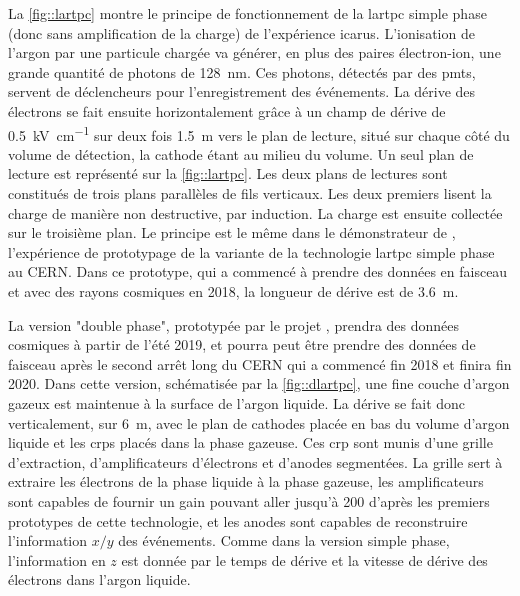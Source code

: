     La \autoref{fig::lartpc} montre le principe de fonctionnement de la \gls{lartpc} simple phase (donc sans amplification de la charge) de l'expérience \gls{icarus}. L'ionisation de l'argon par une particule chargée va générer, en plus des paires électron-ion, une grande quantité de photons de \SI{128}{\nano\meter}. Ces photons, détectés par des \glspl{pmt}, servent de déclencheurs pour l'enregistrement des événements. La dérive des électrons se fait ensuite horizontalement grâce à un champ de dérive de \SI{0.5}{\kilo\volt\per\centi\meter} sur deux fois \SI{1.5}{\meter} vers le plan de lecture, situé sur chaque côté du volume de détection, la cathode étant au milieu du volume. Un seul plan de lecture est représenté sur la \autoref{fig::lartpc}. Les deux plans de lectures sont constitués de trois plans parallèles de fils verticaux. Les deux premiers lisent la charge de manière non destructive, par induction. La charge est ensuite collectée sur le troisième plan. Le principe est le même dans le démonstrateur de \protosp{}, l'expérience de prototypage de la variante de la technologie \gls{lartpc} simple phase au CERN. Dans ce prototype, qui a commencé à prendre des données en faisceau et avec des rayons cosmiques en 2018, la longueur de dérive est de \SI{3.6}{\meter}.

    La version "double phase", prototypée par le projet \protodp{}, prendra des données cosmiques à partir de l'été 2019, et pourra peut être prendre des données de faisceau après le second arrêt long du CERN qui a commencé fin 2018 et finira fin 2020. Dans cette version, schématisée par la \autoref{fig::dlartpc}, une fine couche d'argon gazeux est maintenue à la surface de l'argon liquide. La dérive se fait donc verticalement, sur \SI{6}{\meter}, avec le plan de cathodes placée en bas du volume d'argon liquide et les \glspl{crp} placés dans la phase gazeuse. Ces \gls{crp} sont munis d'une grille d'extraction, d'amplificateurs d'électrons et d'anodes segmentées. La grille sert à extraire les électrons de la phase liquide à la phase gazeuse, les amplificateurs sont capables de fournir un gain pouvant aller jusqu'à 200 d'après les premiers prototypes de cette technologie\cite{Cantini2014}, et les anodes sont capables de reconstruire l'information $x/y$ des événements. Comme dans la version simple phase, l'information en $z$ est donnée par le temps de dérive et la vitesse de dérive des électrons dans l'argon liquide.

